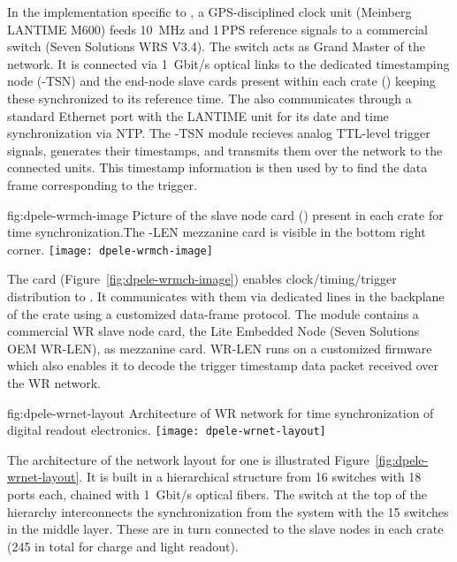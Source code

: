 In the implementation specific to , a GPS-disciplined 
clock unit (Meinberg LANTIME M600) feeds \SI{10}{MHz} and \num{1}\,PPS reference signals to a commercial  switch (Seven Solutions WRS V3.4). The switch acts as Grand Master of the  network. It is connected via \SI{1}{Gbit/s} optical links to the dedicated  timestamping node (-TSN) and the  end-node slave cards present within each  crate () keeping these synchronized to its reference time. The  also communicates through a standard Ethernet port with the LANTIME unit for its date and time synchronization via NTP. The -TSN module recieves analog TTL-level trigger signals, generates their timestamps, and transmits them over the  network to the connected  units. This timestamp information is then used by  to find the data frame corresponding to the trigger. 

\begin{dunefigure}{fig:dpele-wrmch-image}
{Picture of the  slave node card () present in each  crate for time synchronization.The -LEN mezzanine card is visible in the bottom right corner.}
\texttt{[image: dpele-wrmch-image]}
\end{dunefigure}

The  card (Figure~\ref{fig:dpele-wrmch-image}) enables clock/timing/trigger distribution to . It communicates with them via dedicated lines in the backplane of the  crate using a customized data-frame protocol. The module contains a commercial WR slave node card, the  Lite Embedded Node (Seven Solutions OEM WR-LEN), as mezzanine card. WR-LEN runs on a customized firmware which also enables it to decode the trigger timestamp data packet received over the WR network.

\begin{dunefigure}{fig:dpele-wrnet-layout}
{Architecture of WR network for time synchronization of digital readout electronics.}
\texttt{[image: dpele-wrnet-layout]}
\end{dunefigure}

The architecture of the  network layout for one  is illustrated Figure~\ref{fig:dpele-wrnet-layout}. It is built in a hierarchical structure from \num{16}  switches with \num{18} ports each,  chained with \SI{1}{Gbit/s} optical fibers. The switch at the top of the hierarchy interconnects the synchronization %
 from the  system with the \num{15} switches in the middle layer. These are in turn connected to the  slave nodes in each  crate (\num{245} in total for charge and light readout). 



